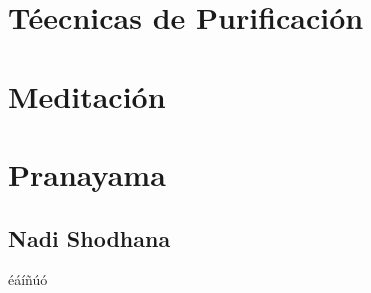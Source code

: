 \section{Téecnicas de Purificación}
\section{Meditación}
\section{Pranayama}
\subsection{Nadi Shodhana}


éáíñúó



























